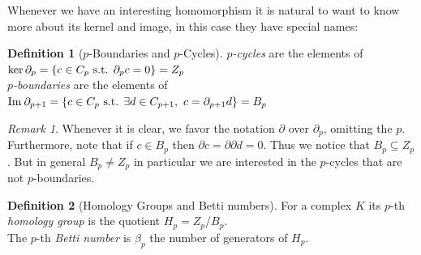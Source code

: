\documentclass{article}
\newcommand{\img}{\textmd{Im}\:}
\newcommand{\st}{\textmd{ s.t. }}
\theoremstyle{plain}
\theoremstyle{definition}
\newtheorem{definition}{Definition}[section]
\theoremstyle{remark}
\newtheorem{remark}{Remark}[section]
\begin{document}
Whenever we have an interesting homomorphism it is natural to want to know more about its kernel and image, in this case they have special names:

\begin{definition}[$p$-Boundaries and $p$-Cycles]
	\emph{$p$-cycles} are the elements of $ \ker\partial_{p} = \{ c \in C_p \st \partial_p c = 0 \} = Z_p $\\
	\emph{$p$-boundaries} are the elements of $ \img\partial_{p+1} = \{ c \in C_p \st \exists d \in C_{p+1} , \ c=\partial_{p+1} d \} = B_p $
\end{definition}

\begin{remark}
Whenever it is clear, we favor the notation $\partial$ over $\partial_p$, omitting the $p$. 
Furthermore, note that if $ c \in B_p $ then $ \partial c = \partial \partial d = 0 $. Thus we notice that $ B_p \subseteq Z_p $. But in general $ B_p \neq Z_p $ in particular we are interested in the $p$-cycles that are not $p$-boundaries.
\end{remark}

\begin{definition}[Homology Groups and Betti numbers]
	For a complex $K$ its $p$-th \emph{homology group} is the quotient $H_p = Z_p/B_p $.\\
	The $p$-th \emph{Betti number} is $ \beta_p $ the number of generators of $H_p$.
\end{definition} 
\end{document}
